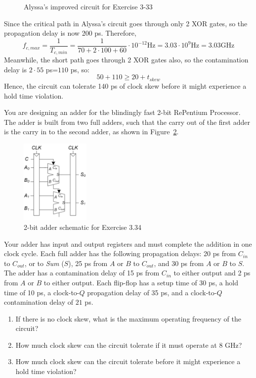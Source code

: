 \documentclass[12pt]{article}
\newenvironment{ex}[2][Exercise]{\begin{trivlist}
		\item[\hskip \labelsep {\bfseries #1}\hskip \labelsep {\bfseries #2.}]}{\end{trivlist}}
\newenvironment{sol}[1][Solution]{\begin{trivlist}
		\item[\hskip \labelsep {\bfseries #1:}]}{\end{trivlist}}
\begin{document}
\begin{sol}
\begin{enumerate}[label=(\alph*)]
\begin{figure}
			\caption{Alyssa's improved circuit for Exercise 3-33}
			\label{03-33-alyssa-circuit}
		\end{figure}
		Since the critical path in Alyssa's circuit goes through only 2 XOR gates,
		so the propagation delay is now 200 ps. Therefore,
		\[
		f_{c, max}=\frac{1}{T_{c, min}}=\frac{1}{70+2\cdot 100+60}\cdot 10^{-12} \text{Hz}
		=3.03\cdot 10^{9}\text{Hz}=3.03 \text{GHz}
		\]
		Meanwhile, the short path goes through 2 XOR gates also, so the contamination delay is $2\cdot 55$ ps=$110$ ps, so:
		\[
		50+110\geq 20+t_{skew}
		\]
		Hence, the circuit can tolerate 140 ps of clock skew before it might experience
		a hold time violation.
	\end{enumerate}
\end{sol}

\begin{ex}{3.34}
	You are designing an adder for the blindingly fast 2-bit RePentium Processor.
	The adder is built from two full adders, such that the carry out of the first adder
	is the carry in to the second adder, as shown in Figure~\ref{03-34-2-bit-adder-circuit}.
	
	\begin{figure}
		\centering
		\includegraphics[width=0.3\textwidth]{03-34-circuit}
		\caption{2-bit adder schematic for Exercise 3.34}
		\label{03-34-2-bit-adder-circuit}
	\end{figure}
	
	Your adder has input and output registers and must complete the addition in one
	clock cycle. Each full adder has the following propagation delays: 20 ps from
	$C_{in}$ to $C_{out}$, or to \emph{Sum} ($S$), 25 ps from $A$ or $B$ to
	$C_{out}$, and 30 ps from $A$ or $B$ to $S$. The adder has a contamination delay
	of 15 ps from $C_{in}$ to either output and 2 ps from $A$ or $B$ to either output.
	Each flip-flop has a setup time of 30 ps, a hold time of 10 ps, a clock-to-$Q$
	propagation delay of 35 ps, and a clock-to-$Q$ contamination delay of $21$ ps.
	\begin{enumerate}[label=(\alph*)]
		\item If there is no clock skew, what is the maximum operating frequency of the circuit?
		\item How much clock skew can the circuit tolerate if it must operate at 8 GHz?
		\item How much clock skew can the circuit tolerate before it might experience a
		hold time violation?
	\end{enumerate}
\end{ex}
\end{document}
